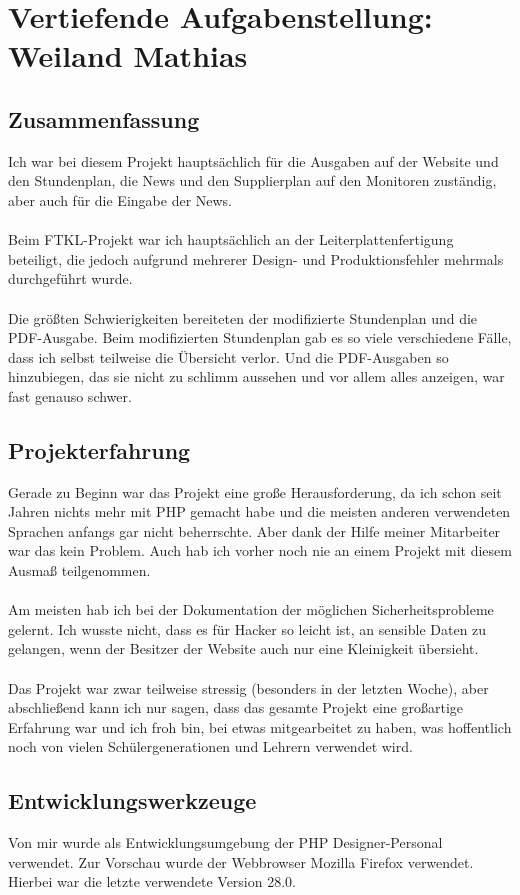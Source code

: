 \chapter[Weiland]{Vertiefende Aufgabenstellung: \\Weiland Mathias}

\section{Zusammenfassung}
Ich war bei diesem Projekt hauptsächlich für die Ausgaben auf der Website und den Stundenplan, die News und den Supplierplan auf den Monitoren zuständig, aber auch für die Eingabe der News. \\\\
Beim FTKL-Projekt war ich hauptsächlich an der Leiterplattenfertigung beteiligt, die jedoch aufgrund mehrerer Design- und Produktionsfehler mehrmals durchgeführt wurde.\\\\
Die größten Schwierigkeiten bereiteten der modifizierte Stundenplan und die PDF-Ausgabe. Beim modifizierten Stundenplan gab es so viele verschiedene Fälle, dass ich selbst teilweise die Übersicht verlor. Und die PDF-Ausgaben so hinzubiegen, das sie nicht zu schlimm aussehen und vor allem alles anzeigen, war fast genauso schwer.
\section{Projekterfahrung}
Gerade zu Beginn war das Projekt eine große Herausforderung, da ich schon seit Jahren nichts mehr mit PHP gemacht habe und die meisten anderen verwendeten Sprachen anfangs gar nicht beherrschte. Aber dank der Hilfe meiner Mitarbeiter war das kein Problem. Auch hab ich vorher noch nie an einem Projekt mit diesem Ausmaß teilgenommen.\\\\
Am meisten hab ich bei der Dokumentation der möglichen Sicherheitsprobleme gelernt. Ich wusste nicht, dass es für Hacker so leicht ist, an sensible Daten zu gelangen, wenn der Besitzer der Website auch nur eine Kleinigkeit übersieht.\\\\
Das Projekt war zwar teilweise stressig (besonders in der letzten Woche), aber abschließend kann ich nur sagen, dass das gesamte Projekt eine großartige Erfahrung war und ich froh bin, bei etwas mitgearbeitet zu haben, was hoffentlich noch von vielen Schülergenerationen und Lehrern verwendet wird.

\section{Entwicklungswerkzeuge}
Von mir wurde als Entwicklungsumgebung der PHP Designer-Personal verwendet. Zur Vorschau wurde der Webbrowser Mozilla Firefox verwendet. Hierbei war die letzte verwendete Version 28.0.